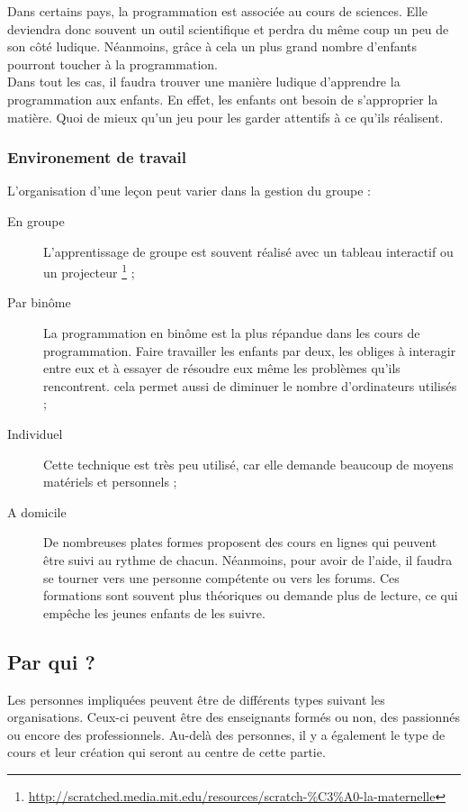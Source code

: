 Dans certains pays, la programmation est associée au cours de sciences. Elle deviendra donc souvent un outil scientifique et perdra du même coup un peu de son côté ludique. Néanmoins, grâce à cela un plus grand nombre d'enfants pourront toucher à la programmation.\\

Dans tout les cas, il faudra trouver une manière ludique d'apprendre la programmation aux enfants. En effet, les enfants ont besoin de s'approprier la matière. Quoi de mieux qu’un jeu pour les garder attentifs à ce qu'ils réalisent.

\subsubsection{Environement de travail}
L'organisation d'une leçon peut varier dans la gestion du groupe :
\begin{description}
  \item[En groupe] L'apprentissage de groupe est souvent réalisé avec un tableau interactif ou un projecteur \footnote{\url{http://scratched.media.mit.edu/resources/scratch-\%C3\%A0-la-maternelle}} ;
  \item[Par binôme] La programmation en binôme est la plus répandue dans les cours de programmation. Faire travailler les enfants par deux, les obliges à interagir entre eux et à essayer de résoudre eux même les problèmes qu'ils rencontrent. cela permet aussi de diminuer le nombre d'ordinateurs utilisés ;
  \item[Individuel] Cette technique est très peu utilisé, car elle demande beaucoup de moyens matériels et personnels ;
  \item[A domicile] De nombreuses plates formes proposent des cours en lignes qui peuvent être suivi au rythme de chacun. Néanmoins, pour avoir de l'aide, il faudra se tourner vers une personne compétente ou vers les forums. Ces formations sont souvent plus théoriques ou demande plus de lecture, ce qui empêche les jeunes enfants de les suivre.
\end{description}

\subsection{Par qui ?}
Les personnes impliquées peuvent être de différents types suivant les organisations. Ceux-ci peuvent être des enseignants formés ou non, des passionnés ou encore des professionnels. Au-delà des personnes, il y a également le type de cours et leur création qui seront au centre de cette partie.

